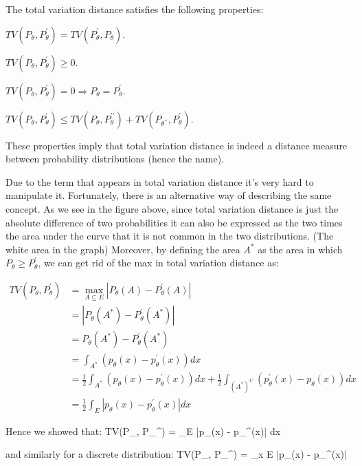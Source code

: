 The total variation distance satisfies the following properties:
\bit
\item $TV(P_{\theta}, P_{\theta}^{\prime}) = TV(P_{\theta}^{\prime}, P_{\theta})$.
\item $TV(P_{\theta}, P_{\theta}^{\prime}) \geq 0$.
\item $TV(P_{\theta}, P_{\theta}^{\prime}) =0 \Rightarrow P_{\theta} = P_{\theta}^{\prime}$.
\item $TV(P_{\theta}, P_{\theta}^{\prime}) \leq TV(P_{\theta}, P_{\theta}^{\prime\prime}) + TV(P_{\theta^{\prime\prime}}, P_{\theta}^{\prime})$.
\eit

These properties imply that total variation distance is indeed a distance measure between probability distributions
(hence the name).


Due to the  term that appears in total variation distance it's very hard to manipulate it. Fortunately,
there is an alternative way of describing the same concept. As we see in the figure above, since total variation
distance is just the absolute difference of two probabilities it can also be expressed as the two times the area
under the curve that it is not common in the two distributions. (The white area in the graph) Moreover, by defining
the area $A^*$ as the area in which $P_{\theta} \geq P_{\theta}^{\prime}$, we can get rid of the max in total
variation distance as:

{\setlength{\jot}{10pt}
\begin{align*}
TV(P_{\theta}, P_{\theta}^{\prime}) & = \max_{A \subseteq E} |P_{\theta} (A) - P_{\theta}^{\prime}(A)| \\
&= |P_{\theta}(A^*) - P_{\theta}^{\prime}(A^*)| \\
&= P_{\theta}(A^*) - P_{\theta}^{\prime}(A^*) \\
&= \int_{A^*} (p_{\theta}(x) - p_{\theta}^{\prime}(x)) dx \\
&= \frac{1}{2} \int_{A^*} (p_{\theta}(x) - p_{\theta}^{\prime}(x)) dx + \frac{1}{2} \int_{(A^*)^C}
(p_{\theta}^{\prime}(x) - p_{\theta}(x)) dx \\
&= \frac{1}{2} \int_{E} |p_{\theta}(x) - p_{\theta}^{\prime}(x)| dx
\end{align*}}

Hence we showed that:
\bse
TV(P_{\theta}, P_{\theta}^{\prime}) =  \int_{E} |p_{\theta}(x) - p_{\theta}^{\prime}(x)| dx
\ese

and similarly for a discrete distribution:
\bse
TV(P_{\theta}, P_{\theta}^{\prime}) =  \sum_{x \in E} |p_{\theta}(x) - p_{\theta}^{\prime}(x)|
\ese


